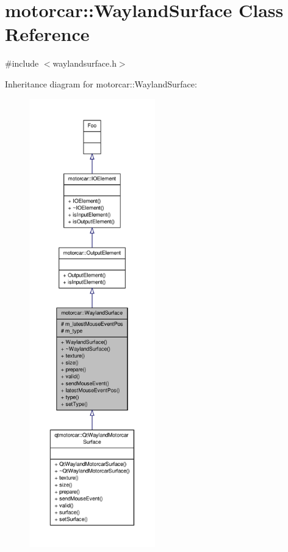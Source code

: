 \hypertarget{classmotorcar_1_1WaylandSurface}{\section{motorcar\-:\-:Wayland\-Surface Class Reference}
\label{classmotorcar_1_1WaylandSurface}
}


{\ttfamily \#include $<$waylandsurface.\-h$>$}



Inheritance diagram for motorcar\-:\-:Wayland\-Surface\-:
\nopagebreak
\begin{figure}[H]
\begin{center}
\leavevmode
\includegraphics[height=550pt]{classmotorcar_1_1WaylandSurface__inherit__graph}
\end{center}
\end{figure}


